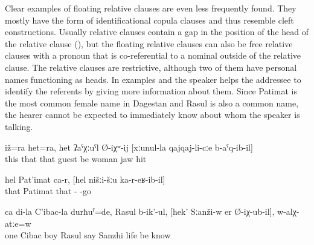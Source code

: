 Clear examples of floating relative clauses are even less frequently found. They mostly have the form of identificational copula clauses and thus resemble cleft constructions. Usually relative clauses contain a gap in the position of the head of the relative clause (), but the floating relative clauses can also be free relative clauses with a pronoun that is co-referential to a nominal outside of the relative clause. The relative clauses are restrictive, although two of them have personal names functioning as heads. In examples  and  the speaker helps the addressee to identify the referents by giving more information about them. Since Patimat is the most common female name in Dagestan and Rasul is also a common name, the hearer cannot be expected to immediately know about whom the speaker is talking.
%
\begin{exe}
	\ex	\label{ex:‎This also and this also is probably the man who hit the woman on the jaw}
	\gll	iž=ra	het=ra,	het	ʡaˁχːuˁl	Ø-iχʷ-ij	[xːunul-la	qajqaj-li-cːe	b-aˁq-ib-il]\\
		this	that	that	guest	be	woman	jaw	hit\\
	\glt	{}

	\ex	\label{ex:‎‎That is the Patimat who had come to us. (She is the daughter}
	\gll	hel	Pat'imat	ca-r,	[hel	nišːi-šːu	ka-r-eʁ-ib-il]\\
		that	Patimat		that	- -go\\
	\glt	{}

	\ex	\label{ex:One was the son of my Cibac, his name is Rasul, the one that lived in Sanzhi, do you know him}
	\gll	ca	di-la	C'ibac-la	durħuˁ=de,	Rasul	b-ik'-ul,	[hek'	Sːanži-w er	Ø-iχ-ub-il],	w-alχ-atːe=w	\\
		one		Cibac	boy	Rasul	say		Sanzhi	life	\tsc{m-}be	know\\
	\glt	{}
\end{exe}

